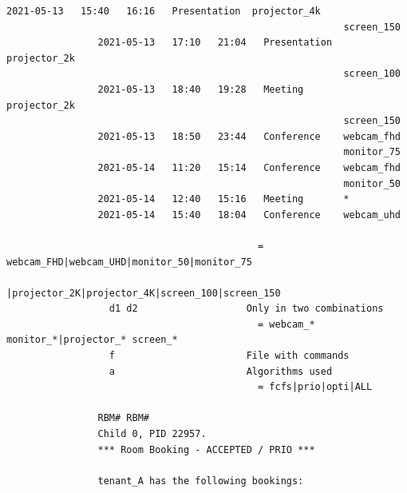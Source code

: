\documentclass{article}
\begin{document}
\begin{Verbatim}[gobble=8]
                2021-05-13   15:40   16:16   Presentation  projector_4k
                                                           screen_150
                2021-05-13   17:10   21:04   Presentation  projector_2k
                                                           screen_100
                2021-05-13   18:40   19:28   Meeting       projector_2k
                                                           screen_150
                2021-05-13   18:50   23:44   Conference    webcam_fhd
                                                           monitor_75
                2021-05-14   11:20   15:14   Conference    webcam_fhd
                                                           monitor_50
                2021-05-14   12:40   15:16   Meeting       *
                2021-05-14   15:40   18:04   Conference    webcam_uhd
                                                     
                                            = webcam_FHD|webcam_UHD|monitor_50|monitor_75     
                                              |projector_2K|projector_4K|screen_100|screen_150
                  d1 d2                   Only in two combinations                            
                                            = webcam_* monitor_*|projector_* screen_*         
                  f                       File with commands                                  
                  a                       Algorithms used                                     
                                            = fcfs|prio|opti|ALL                              
                
                RBM# RBM#
                Child 0, PID 22957.
                *** Room Booking - ACCEPTED / PRIO ***
                
                tenant_A has the following bookings:
                

\end{Verbatim}
\end{document}
